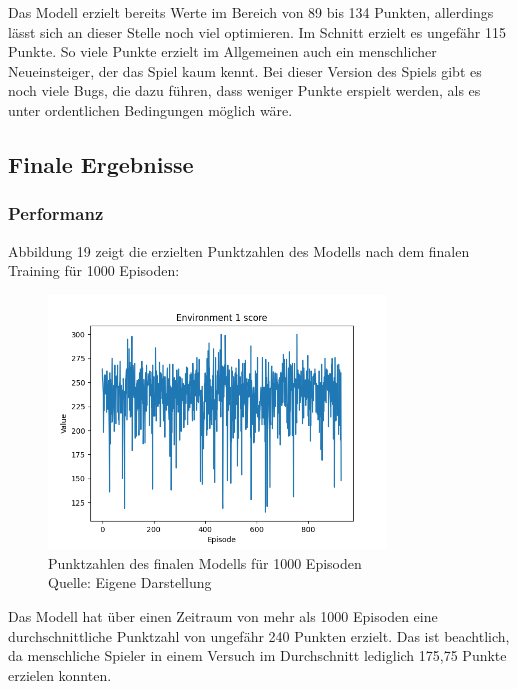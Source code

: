 Das Modell erzielt bereits Werte im Bereich von 89 bis 134 Punkten, allerdings lässt sich an dieser Stelle noch viel optimieren. Im Schnitt erzielt es ungefähr 115 Punkte. So viele Punkte erzielt im Allgemeinen auch ein menschlicher Neueinsteiger, der das Spiel kaum kennt. Bei dieser Version des Spiels gibt es noch viele Bugs, die dazu führen, dass weniger Punkte erspielt werden, als es unter ordentlichen Bedingungen möglich wäre.
\subsection{Finale Ergebnisse}
\subsubsection{Performanz}
Abbildung 19 zeigt die erzielten Punktzahlen des Modells nach dem finalen Training für 1000 Episoden:
\nopagebreak
\begin{figure}[H]
	\centering
	\includegraphics[width=0.8\textwidth]{Bilder/finalp1} 
	\caption[Punktzahlen des finalen Modells für 1000 Episoden]{Punktzahlen des finalen Modells für 1000 Episoden\\ Quelle: Eigene Darstellung}
\end{figure}

Das Modell hat über einen Zeitraum von mehr als 1000 Episoden eine durchschnittliche Punktzahl von ungefähr 240 Punkten erzielt. Das ist beachtlich, da menschliche Spieler in einem Versuch im Durchschnitt lediglich 175,75 Punkte erzielen konnten.\\

